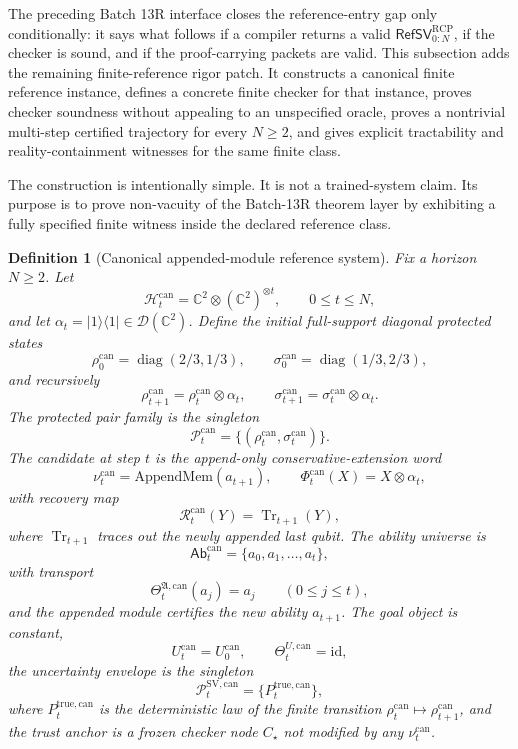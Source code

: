 \documentclass[11pt]{article}
\newtheorem{definition}[theorem]{Definition}
\newcommand{\D}{\mathcal{D}}
\newcommand{\Hcal}{\mathcal{H}}
\newcommand{\Pcal}{\mathcal{P}}
\newcommand{\Tr}{\operatorname{Tr}}
\newcommand{\1}{\mathbf{1}}
\newcommand{\RCP}{\mathrm{RCP}}
\providecommand{\true}{\mathrm{true}}
\begin{document}
The preceding Batch 13R interface closes the reference-entry gap only conditionally: it says what follows if a compiler returns a valid \(\mathsf{RefSV}_{0:N}^{\RCP}\), if the checker is sound, and if the proof-carrying packets are valid.  This subsection adds the remaining finite-reference rigor patch.  It constructs a canonical finite reference instance, defines a concrete finite checker for that instance, proves checker soundness without appealing to an unspecified oracle, proves a nontrivial multi-step certified trajectory for every \(N\ge2\), and gives explicit tractability and reality-containment witnesses for the same finite class.

The construction is intentionally simple.  It is not a trained-system claim.  Its purpose is to prove non-vacuity of the Batch-13R theorem layer by exhibiting a fully specified finite witness inside the declared reference class.

\begin{definition}[Canonical appended-module reference system]
\label{def:batch13ra_canonical_appended_module_system}
Fix a horizon \(N\ge2\).  Let
\[
\Hcal_t^{\mathrm{can}}
=\mathbb C^2\otimes (\mathbb C^2)^{\otimes t},
\qquad
0\le t\le N,
\]
and let \(\alpha_t=\lvert 1\rangle\langle 1\rvert\in\D(\mathbb C^2)\).  Define the initial full-support diagonal protected states
\[
\rho_0^{\mathrm{can}}=\operatorname{diag}(2/3,1/3),
\qquad
\sigma_0^{\mathrm{can}}=\operatorname{diag}(1/3,2/3),
\]
and recursively
\[
\rho_{t+1}^{\mathrm{can}}=
\rho_t^{\mathrm{can}}\otimes\alpha_t,
\qquad
\sigma_{t+1}^{\mathrm{can}}=\sigma_t^{\mathrm{can}}\otimes\alpha_t.
\]
The protected pair family is the singleton
\[
\Pcal_t^{\mathrm{can}}=
\{(\rho_t^{\mathrm{can}},\sigma_t^{\mathrm{can}})\}.
\]
The candidate at step \(t\) is the append-only conservative-extension word
\[
\nu_t^{\mathrm{can}}=\mathrm{AppendMem}(a_{t+1}),
\qquad
\Phi_t^{\mathrm{can}}(X)=X\otimes\alpha_t,
\]
with recovery map
\[
\mathcal R_t^{\mathrm{can}}(Y)=\Tr_{t+1}(Y),
\]
where \(\Tr_{t+1}\) traces out the newly appended last qubit.  The ability universe is
\[
\mathsf{Ab}_t^{\mathrm{can}}=\{a_0,a_1,\ldots,a_t\},
\]
with transport
\[
\Theta_t^{\mathfrak A,\mathrm{can}}(a_j)=a_j
\qquad (0\le j\le t),
\]
and the appended module certifies the new ability \(a_{t+1}\).  The goal object is constant,
\[
U_t^{\mathrm{can}}=U_0^{\mathrm{can}},
\qquad
\Theta_t^{U,\mathrm{can}}=\mathrm{id},
\]
the uncertainty envelope is the singleton
\[
\Pcal_t^{\mathrm{SV},\mathrm{can}}=\{P_t^{\true,\mathrm{can}}\},
\]
where \(P_t^{\true,\mathrm{can}}\) is the deterministic law of the finite transition \(\rho_t^{\mathrm{can}}\mapsto\rho_{t+1}^{\mathrm{can}}\), and the trust anchor is a frozen checker node \(C_\star\) not modified by any \(\nu_t^{\mathrm{can}}\).
\end{definition}
\end{document}
